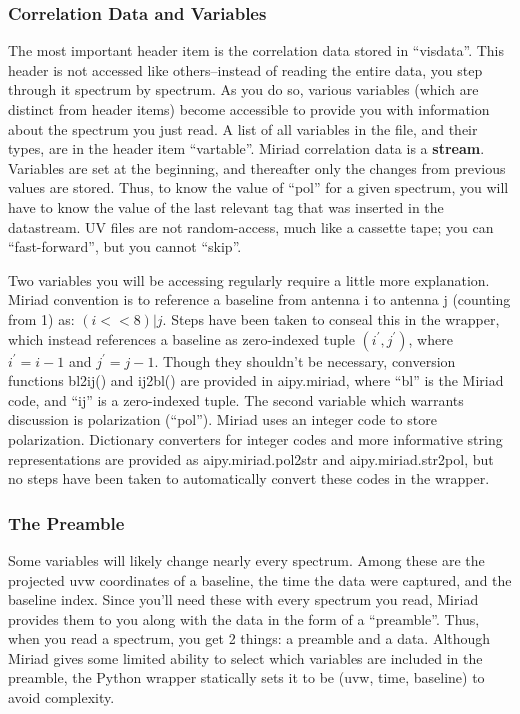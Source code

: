 \subsubsection{Correlation Data and Variables}
The most important header item is the correlation data stored
in ``visdata''.  This header is not accessed like others--instead of
reading the entire data, you step through it spectrum by spectrum.  As you do
so, various variables (which are distinct from header items) become accessible
to provide you with information about the spectrum you just read.  A list of
all variables in the file, and their types, are in the header item ``vartable''.
Miriad correlation data is a {\bf stream}.  Variables are set at the beginning,
and thereafter only the changes from previous values are stored.  Thus, to
know the value of ``pol'' for a given spectrum, you will have to know the
value of the last relevant tag that was inserted in the datastream.
UV files are not random-access, much like a cassette tape; you can
``fast-forward'', but you cannot ``skip''.

Two variables you will be accessing regularly require a little more
explanation.  Miriad convention is to reference a baseline from antenna i to
antenna j (counting from 1) as: $(i << 8) | j$.  Steps have been taken to
conseal this in the wrapper, which instead references a baseline as
zero-indexed tuple $(i^\prime, j^\prime)$, where $i^\prime = i-1$ and $j^\prime
= j-1$.  Though they shouldn't be necessary, conversion functions bl2ij() and
ij2bl() are provided in aipy.miriad, where ``bl'' is the Miriad code, and
``ij'' is a zero-indexed tuple.  The second variable which warrants discussion 
is polarization (``pol'').  Miriad uses an integer code to store polarization.  
Dictionary converters for integer codes and more informative string 
representations are provided as aipy.miriad.pol2str and aipy.miriad.str2pol, 
but no steps have been taken to automatically convert these codes in the
wrapper.

\subsubsection{The Preamble}
Some variables will likely change nearly every spectrum.  Among these are
the projected uvw coordinates of a baseline, the time the data were captured,
and the baseline index.  Since you'll need these with every spectrum you read,
Miriad provides them to you along with the data in the form of a ``preamble''.
Thus, when you read a spectrum, you get 2 things: a preamble and a data.
Although Miriad gives some limited ability to select which variables are
included in the preamble, the Python wrapper statically sets it to be
(uvw, time, baseline) to avoid complexity.

